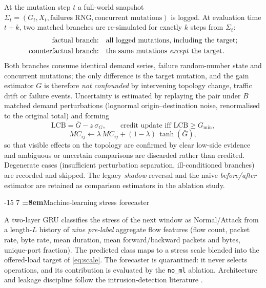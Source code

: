 \documentclass[runningheads]{llncs}
\makeatletter
\renewcommand\subsection{\@startsection{subsection}{2}{\z@}%
  {-15\p@ \@plus -4\p@ \@minus -4\p@}%
  {7\p@ \@plus 4\p@ \@minus 4\p@}%
  {\normalfont\normalsize\bfseries\boldmath\color{vitblue}%
   \rightskip=\z@ \@plus 8em\pretolerance=10000}}
\makeatother
\begin{document}
At the mutation step $t$ a full-world snapshot
$\Sigma_t = (G_t, X_t, \text{failures RNG}, \text{concurrent mutations})$
is logged. At evaluation time $t+k$, two matched branches are re-simulated
for exactly $k$ steps from $\Sigma_t$:
\begin{align*}
\text{factual branch:} &\quad \text{all logged mutations, including the target;}\\
\text{counterfactual branch:} &\quad \text{the same mutations \emph{except} the target.}
\end{align*}
Both branches consume identical demand series, failure random-number state
and concurrent mutations; the only difference is the target mutation, and
the gain estimator $G$ is therefore \emph{not confounded} by intervening
topology change, traffic drift or failure events. Uncertainty is estimated
by replaying the pair under $B$ matched demand perturbations (lognormal
origin--destination noise, renormalised to the original total) and forming
\begin{equation}
\text{LCB} = \bar{G} - z\,\sigma_{G}, \qquad
\text{credit update iff } \text{LCB} \ge G_{\min},
\label{eq:lcb}
\end{equation}
\begin{equation}
MC_{ij} \leftarrow \lambda\,MC_{ij} + (1-\lambda)\,\tanh(\bar{G}),
\label{eq:credit}
\end{equation}
so that visible effects on the topology are confirmed by clear low-side
evidence and ambiguous or uncertain comparisons are discarded rather than
credited. Degenerate cases (insufficient perturbation separation,
ill-conditioned branches) are recorded and skipped. The legacy
\emph{shadow} reversal and the naive \emph{before/after} estimator are
retained as comparison estimators in the ablation study.

\subsection{Machine-learning stress forecaster}
\label{sec:model-ml}

A two-layer GRU \cite{cho2014} classifies the stress of the next window as
Normal/Attack from a length-$L$ history of \emph{nine pre-label} aggregate
flow features (flow count, packet rate, byte rate, mean duration, mean
forward/backward packets and bytes, unique-port fraction). The predicted
class maps to a stress scale blended into the offered-load target of
\eqref{eq:scale}. The forecaster is quarantined: it never selects
operations, and its contribution is evaluated by the \texttt{no\_ml}
ablation. Architecture and leakage discipline follow the intrusion-detection
literature \cite{nithya2026,ali2024bert,wu2024,kumar2026}.
\end{document}
